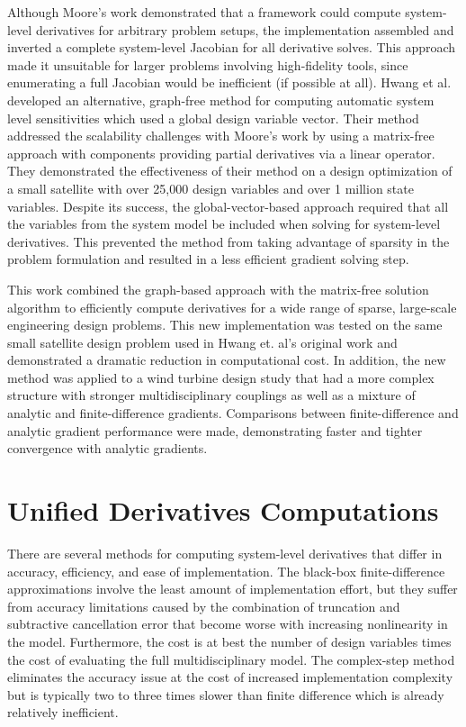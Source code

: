 \documentclass[]{aiaa-tc} %
\begin{document}
    Although Moore's work demonstrated that a framework could compute system-level derivatives for arbitrary
    problem setups, the implementation assembled and inverted a complete system-level Jacobian for
    all derivative solves.  This approach made it unsuitable for larger problems involving
    high-fidelity tools, since enumerating a full Jacobian would be inefficient (if possible at all).
    Hwang et al. developed an alternative, graph-free method for computing automatic system
    level sensitivities which used a global design variable vector\cite{CADRE2012}. Their method
    addressed the scalability challenges with Moore's work by using a matrix-free approach with
    components providing partial derivatives via a linear operator. They demonstrated the
    effectiveness of their method on a design optimization of a small satellite
    with over 25,000 design variables and over 1 million state variables. Despite its success,
    the global-vector-based approach required that all the variables from the system model be
    included when solving for system-level derivatives. This prevented the method
    from taking advantage of sparsity in the problem formulation and resulted in a less efficient gradient solving step.

    This work combined the graph-based approach with the matrix-free solution algorithm
    to efficiently compute derivatives for a wide range of sparse, large-scale engineering
    design problems. This new implementation was tested on the same small satellite design problem used in
    Hwang et. al's original work and demonstrated a dramatic reduction in computational cost. In addition,
    the new method was applied to a wind turbine design study that had a more
    complex structure with stronger multidisciplinary couplings as well as a mixture of
    analytic and finite-difference gradients. Comparisons between finite-difference and analytic gradient
    performance were made, demonstrating faster and tighter convergence with analytic gradients.

  \section{Unified Derivatives Computations}

    There are several methods for computing system-level derivatives that differ in accuracy, efficiency, and ease of implementation.
    The black-box finite-difference approximations involve the least amount of implementation effort, but they suffer from accuracy
  limitations caused by the combination of truncation and subtractive cancellation error that become worse with increasing nonlinearity in the model.
    Furthermore, the cost is at best the number of design variables times the cost of evaluating the full multidisciplinary model.
    The complex-step method eliminates the accuracy issue at the cost of increased implementation complexity but is typically 
    two to three times slower than finite difference which is already relatively inefficient.
\end{document}
